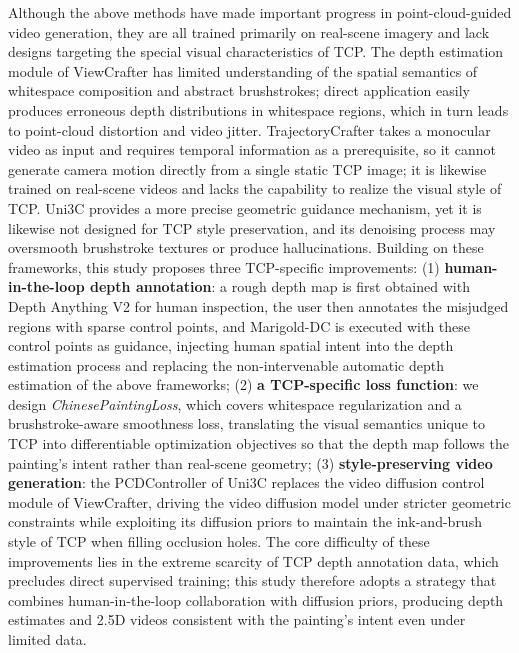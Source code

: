 Although the above methods have made important progress in point-cloud-guided video generation,
they are all trained primarily on real-scene imagery and lack designs targeting the special visual characteristics of TCP.
The depth estimation module of ViewCrafter has limited understanding of the spatial semantics of whitespace composition and abstract brushstrokes;
direct application easily produces erroneous depth distributions in whitespace regions, which in turn leads to point-cloud distortion and video jitter.
TrajectoryCrafter takes a monocular video as input and requires temporal information as a prerequisite,
so it cannot generate camera motion directly from a single static TCP image; it is likewise trained on real-scene videos
and lacks the capability to realize the visual style of TCP.
Uni3C provides a more precise geometric guidance mechanism, yet it is likewise not designed for TCP style preservation,
and its denoising process may oversmooth brushstroke textures or produce hallucinations.
Building on these frameworks, this study proposes three TCP-specific improvements:
(1) \textbf{human-in-the-loop depth annotation}: a rough depth map is first obtained with Depth Anything V2 \cite{depthanythingv2} for human inspection,
the user then annotates the misjudged regions with sparse control points, and Marigold-DC is executed with these control points as guidance,
injecting human spatial intent into the depth estimation process and replacing the non-intervenable automatic depth estimation of the above frameworks;
(2) \textbf{a TCP-specific loss function}: we design \textit{ChinesePaintingLoss},
which covers whitespace regularization and a brushstroke-aware smoothness loss,
translating the visual semantics unique to TCP into differentiable optimization objectives so that the depth map follows the painting's intent rather than real-scene geometry;
(3) \textbf{style-preserving video generation}: the PCDController of Uni3C replaces the video diffusion control module of ViewCrafter,
driving the video diffusion model under stricter geometric constraints while exploiting its diffusion priors to maintain the ink-and-brush style of TCP when filling occlusion holes.
The core difficulty of these improvements lies in the extreme scarcity of TCP depth annotation data, which precludes direct supervised training;
this study therefore adopts a strategy that combines human-in-the-loop collaboration with diffusion priors, producing depth estimates and 2.5D videos consistent with the painting's intent even under limited data.
